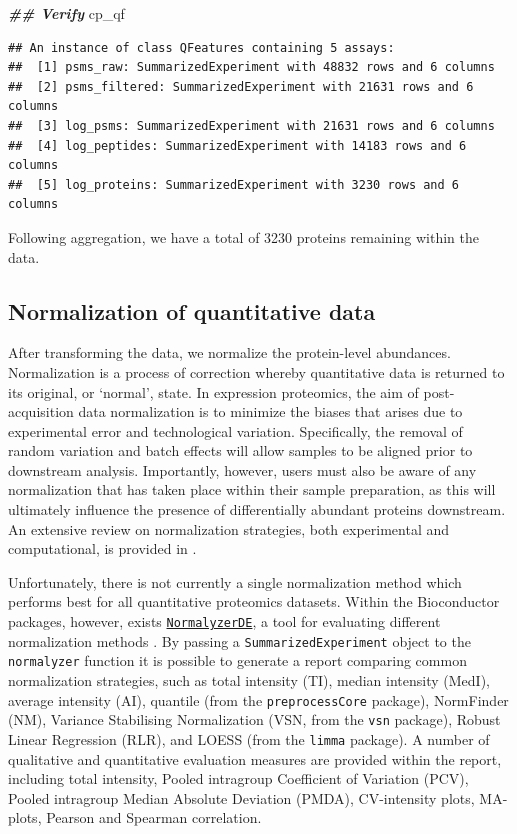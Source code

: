 \documentclass[9pt,a4paper,]{extarticle}
\newenvironment{Shaded}{\begin{snugshade}}{\end{snugshade}}
\newcommand{\DocumentationTok}[1]{\textcolor[rgb]{0.56,0.35,0.01}{\textbf{\textit{#1}}}}
\newcommand{\NormalTok}[1]{#1}
\begin{document}
\begin{Shaded}
\begin{Highlighting}[]
\DocumentationTok{\#\# Verify}
\NormalTok{cp\_qf}
\end{Highlighting}
\end{Shaded}

\begin{verbatim}
## An instance of class QFeatures containing 5 assays:
##  [1] psms_raw: SummarizedExperiment with 48832 rows and 6 columns 
##  [2] psms_filtered: SummarizedExperiment with 21631 rows and 6 columns 
##  [3] log_psms: SummarizedExperiment with 21631 rows and 6 columns 
##  [4] log_peptides: SummarizedExperiment with 14183 rows and 6 columns 
##  [5] log_proteins: SummarizedExperiment with 3230 rows and 6 columns
\end{verbatim}

Following aggregation, we have a total of 3230
proteins remaining within the data.

\subsection{Normalization of quantitative data}\label{normalization-of-quantitative-data}

After transforming the data, we normalize the protein-level abundances.
Normalization is a process of correction whereby quantitative data is returned
to its original, or `normal', state. In expression proteomics, the aim of post-
acquisition data normalization is to minimize the biases that arises due to
experimental error and technological variation. Specifically, the removal of
random variation and batch effects will allow samples to be aligned prior to
downstream analysis. Importantly, however, users must also be aware of any
normalization that has taken place within their sample preparation, as this will
ultimately influence the presence of differentially abundant proteins
downstream. An extensive review on normalization strategies, both experimental
and computational, is provided in \citep{ORourke2019}.

Unfortunately, there is not currently a single normalization method which
performs best for all quantitative proteomics datasets. Within the Bioconductor
packages, however, exists
\href{https://www.bioconductor.org/packages/release/bioc/html/NormalyzerDE.html}{\texttt{NormalyzerDE}},
a tool for evaluating different normalization methods \citep{Willforss2018}. By
passing a \texttt{SummarizedExperiment} object to the \texttt{normalyzer} function it is
possible to generate a report comparing common normalization strategies, such as
total intensity (TI), median intensity (MedI), average intensity (AI), quantile
(from the \texttt{preprocessCore} package)\citep{preprocessCore}, NormFinder (NM)\citep{Andersen2004},
Variance Stabilising Normalization (VSN, from the \texttt{vsn} package)\citep{Huber2002},
Robust Linear Regression (RLR), and LOESS (from the \texttt{limma} package)\citep{Smyth2004}.
A number of qualitative and quantitative evaluation measures are provided within
the report, including total intensity, Pooled intragroup Coefficient of Variation
(PCV), Pooled intragroup Median Absolute Deviation (PMDA), CV-intensity plots,
MA-plots, Pearson and Spearman correlation.
\end{document}
